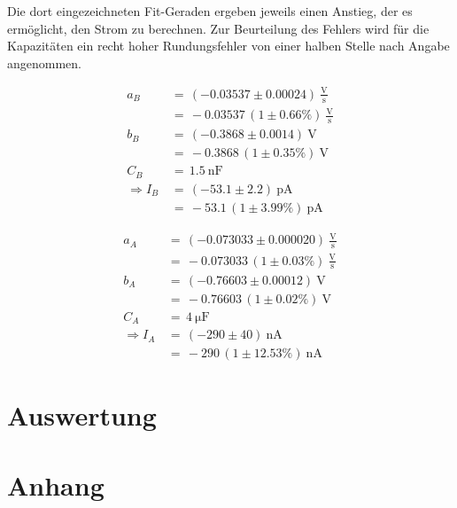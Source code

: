 \documentclass[10pt,a4paper]{scrartcl}
\begin{document}
Die dort eingezeichneten Fit-Geraden ergeben jeweils einen Anstieg,
der es ermöglicht, den Strom zu berechnen.
Zur Beurteilung des Fehlers wird für die Kapazitäten ein
recht hoher Rundungsfehler von einer halben Stelle nach Angabe angenommen.

\begin{align*}
    a_B \,&=\, \left(-0.03537\pm 0.00024\right)~\mathrm{\frac{V}{s}}\\
          &=\, -0.03537 \, \left(1\pm0.66\%\right)~\mathrm{\frac{V}{s}}\\
    b_B \,&=\, \left(-0.3868 \pm 0.0014\right)~\mathrm V\\
          &=\, -0.3868 \, \left(1\pm 0.35\%\right)~\mathrm V\\
    C_B \,&=\,1.5~\mathrm{nF}\\
    \Rightarrow
    I_B \,&=\, \left(-53.1\pm2.2\right)~\mathrm{pA}\\
    &=\, -53.1\,\left(1\pm3.99\%\right)~\mathrm{pA}
\end{align*}

\begin{align*}
    a_A \,&=\, \left(-0.073033\pm 0.000020\right)~\mathrm{\frac{V}{s}}\\
          &=\, -0.073033 \, \left(1\pm0.03\%\right)~\mathrm{\frac{V}{s}}\\
    b_A \,&=\, \left(-0.76603 \pm 0.00012\right)~\mathrm V\\
          &=\, -0.76603 \, \left(1\pm 0.02\%\right)~\mathrm V\\
    C_A \,&=\,4~\mathrm{\mu F}\\
    \Rightarrow
    I_A \,&=\, \left(-290\pm40\right)~\mathrm{nA}\\
    &=\, -290\,\left(1\pm12.53\%\right)~\mathrm{nA}
\end{align*}

\section {Auswertung}



\pagebreak

\section {Anhang}
\end{document}
